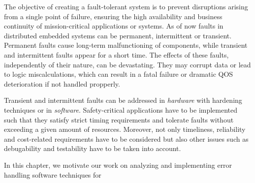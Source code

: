 \documentclass[10pt, a4paper]{report}
\begin{document}
The objective of creating a fault-tolerant system is to prevent disruptions
arising from a single point of failure, ensuring the high availability and
business continuity of mission-critical applications or systems. As of now 
faults in distributed embedded systems can be permanent, intermittent or 
transient. Permanent faults cause long-term malfunctioning of components, while 
transient and intermittent faults appear for a short time. The effects of these 
faults, independently of their nature, can be devastating. They may corrupt data
or lead to logic miscalculations, which can result in a fatal failure or 
dramatic \acrshort{QOS} deterioration if not handled propperly. 

Transient and intermittent faults can be addressed in \emph{hardware} with
hardening techniques or in \emph{software}. Safety-critical applications have to
be implemented such that they satisfy strict timing requirements and tolerate
faults without exceeding a given amount of resources. Moreover, not only
timeliness, reliability and cost-related requirements have to be considered but
also other issues such as debugability and testability have to be taken into
account. 

In this chapter, we motivate our work on analyzing and implementing error
handling software techniques for 

\newpage

\glsaddall
\printnoidxglossary[type=\acronymtype,title={Abreviaturas}]
\end{document}
